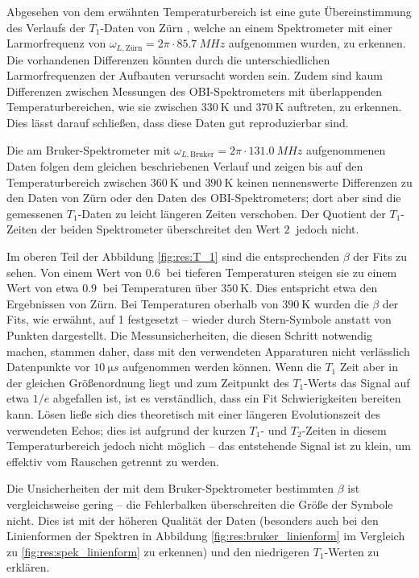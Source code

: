 Abgesehen von dem erwähnten Temperaturbereich ist eine gute Übereinstimmung des Verlaufs der $T_1$-Daten von Zürn \cite{zuern_paper}, welche an einem Spektrometer mit einer Larmorfrequenz von $\omega_{L, \text{Zürn}} = 2\pi \cdot \SI{85.7}{MHz}$ aufgenommen wurden, zu erkennen. Die vorhandenen Differenzen könnten durch die unterschiedlichen Larmorfrequenzen der Aufbauten verursacht worden sein. Zudem sind kaum Differenzen zwischen Messungen des OBI-Spektrometers mit überlappenden Temperaturbereichen, wie sie zwischen $\SI{330}{\kelvin}$ und $\SI{370}{\kelvin}$ auftreten, zu erkennen. Dies lässt darauf schließen, dass diese Daten gut reproduzierbar sind.

Die am Bruker-Spektrometer mit $\omega_{L, \text{Bruker}} = 2\pi \cdot \SI{131.0}{MHz}$ aufgenommenen Daten folgen dem gleichen beschriebenen Verlauf und zeigen bis auf den Temperaturbereich zwischen $\SI{360}{\kelvin}$ und $\SI{390}{\kelvin}$ keinen nennenswerte Differenzen zu den Daten von Zürn oder den Daten des OBI-Spektrometers; dort aber sind die gemessenen $T_1$-Daten zu leicht längeren Zeiten verschoben. Der Quotient der $T_1$-Zeiten der beiden Spektrometer überschreitet den Wert $\SI{2}{}$ jedoch nicht.

Im oberen Teil der Abbildung \ref{fig:res:T_1} sind die entsprechenden $\beta$ der Fits zu sehen. Von einem Wert von $\SI{0.6}{}$ bei tieferen Temperaturen steigen sie zu einem Wert von etwa $\SI{0.9}{}$ bei Temperaturen über $\SI{350}{\kelvin}$. Dies entspricht etwa den Ergebnissen von Zürn. Bei Temperaturen oberhalb von $\SI{390}{\kelvin}$ wurden die $\beta$ der Fits, wie erwähnt, auf 1 festgesetzt -- wieder durch Stern-Symbole anstatt von Punkten dargestellt. Die Messunsicherheiten, die diesen Schritt notwendig machen, stammen daher, dass mit den verwendeten Apparaturen nicht verlässlich Datenpunkte vor $\SI{10}{\micro s}$ aufgenommen werden können. Wenn die $T_1$ Zeit aber in der gleichen Größenordnung liegt und zum Zeitpunkt des $T_1$-Werts das Signal auf etwa $1/e$ abgefallen ist, ist es verständlich, dass ein Fit Schwierigkeiten bereiten kann. Lösen ließe sich dies theoretisch mit einer längeren Evolutionszeit des verwendeten Echos; dies ist aufgrund der kurzen $T_1$- und $T_2$-Zeiten in diesem Temperaturbereich jedoch nicht möglich -- das entstehende Signal ist zu klein, um effektiv vom Rauschen getrennt zu werden.

Die Unsicherheiten der mit dem Bruker-Spektrometer bestimmten $\beta$ ist vergleichsweise gering -- die Fehlerbalken überschreiten die Größe der Symbole nicht. Dies ist mit der höheren Qualität der Daten (besonders auch bei den Linienformen der Spektren in Abbildung \ref{fig:res:bruker_linienform} im Vergleich zu \ref{fig:res:spek_linienform} zu erkennen) und den niedrigeren $T_1$-Werten zu erklären.



